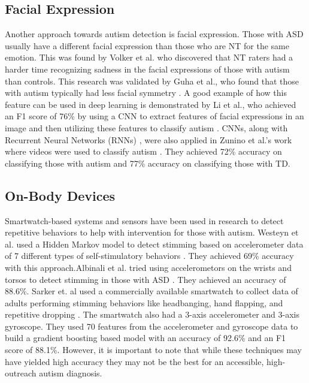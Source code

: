 \documentclass{article}
\begin{document}
\subsection{Facial Expression}
Another approach towards autism detection is facial expression. Those with ASD usually have a different facial expression than those who are NT for the same emotion. This was found by Volker et al. \cite{FacialEncodingForHFASD} who discovered that NT raters had a harder time recognizing sadness in the facial expressions of those with autism than controls. This research was validated by Guha et al., who found that those with autism typically had less facial symmetry \cite{7178080}. A good example of how this feature can be used in deep learning is demonstrated by Li et al., who achieved an F1 score of 76\% by using a CNN to extract features of facial expressions in an image and then utilizing these features to classify autism \cite{8803604}. CNNs, along with Recurrent Neural Networks (RNNs) \cite{rumelhart1985learning}, were also applied in Zunino et al.'s work where videos were used to classify autism \cite{8545095}. They achieved 72\% accuracy on classifying those with autism and 77\% accuracy on classifying those with TD. 

\subsection{On-Body Devices} 

Smartwatch-based systems and sensors have been used in research to detect repetitive behaviors to help with intervention for those with autism. Westeyn et al. used a Hidden Markov model to detect stimming based on accelerometer data of 7 different types of self-stimulatory behaviors \cite{westeyn2005recognizing}. They achieved 69\% accuracy with this approach.Albinali et al. tried using accelerometors on the wrists and torsos to detect stimming in those with ASD \cite{albinali2009recognizing}. They achieved an accuracy of 88.6\%. Sarker et. al used a commercially available smartwatch to collect data of adults performing stimming behaviors like headbanging, hand flapping, and repetitive dropping \cite{sarker2018detection}. The smartwatch also had a 3-axis accelerometer and 3-axis gyroscope. They used 70 features from the accelerometer and gyroscope data to build a gradient boosting based model with an accuracy of 92.6\% and an F1 score of 88.1\%. However, it is important to note that while these techniques may have yielded high accuracy they may not be the best for an accessible, high-outreach autism diagnosis. 
\end{document}
